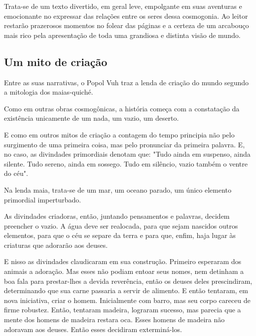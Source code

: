\documentclass[12pt]{extarticle}
\begin{document}
Trata-se de um texto divertido, em geral leve, empolgante em suas
aventuras e emocionante no expressar das relações entre os seres dessa
cosmogonia. Ao leitor restarão prazerosos momentos no folear das páginas
e a certeza de um arcabouço mais rico pela apresentação de toda uma
grandiosa e distinta visão de mundo.

\subsection{Um mito de criação}

Entre as suas narrativas, o Popol Vuh traz a lenda de criação do mundo
segundo a mitologia dos maias-quiché.

Como em outras obras cosmogônicas, a história começa com a constatação
da existência unicamente de um nada, um vazio, um deserto.

E como em outros mitos de criação a contagem do tempo principia não pelo
surgimento de uma primeira coisa, mas pelo pronunciar da primeira
palavra. E, no caso, as divindades primordiais denotam que: "Tudo ainda
em suspenso, ainda silente. Tudo sereno, ainda em sossego. Tudo em
silêncio, vazio também o ventre do céu".






Na lenda maia, trata-se de um mar, um oceano parado, um único elemento
primordial imperturbado.

As divindades criadoras, então, juntando pensamentos e palavras, decidem
preencher o vazio. A água deve ser realocada, para que sejam nascidos
outros elementos, para que o céu se separe da terra e para que, enfim,
haja lugar às criaturas que adorarão aos deuses.

E nisso as divindades claudicaram em sua construção. Primeiro esperaram
dos animais a adoração. Mas esses não podiam entoar seus nomes, nem
detinham a boa fala para prestar-lhes a devida reverência, então os
deuses deles prescindiram, determinando que sua carne passaria a servir
de alimento. E então tentaram, em nova iniciativa, criar o homem.
Inicialmente com barro, mas seu corpo careceu de firme robustez. Então,
tentaram madeira, lograram sucesso, mas parecia que a mente dos homens
de madeira restara oca. Esses homens de madeira não adoravam aos deuses.
Então esses decidiram exterminá-los.
\end{document}
